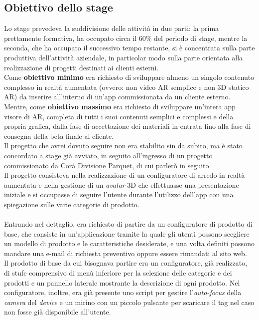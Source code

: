 \subsection{Obiettivo dello stage}
Lo stage prevedeva la suddivisione delle attivit\`a in due parti: la prima prettamente formativa, ha occupato circa il 60\% del periodo di stage, mentre la seconda, che ha occupato il successivo tempo restante, si \`e concentrata sulla parte produttiva dell’attività aziendale, in particolar modo sulla parte orientata alla realizzazione di progetti destinati ai clienti esterni.
\\
Come \textbf{obiettivo minimo} era richiesto di sviluppare almeno un singolo contenuto complesso in realtà aumentata (ovvero: non video AR semplice e non 3D statico AR) da inserire all’interno di un’app commissionata da un cliente esterno. 
\\
Mentre, come \textbf{obiettivo massimo} era richiesto di sviluppare un’intera app visore di AR, completa di tutti i suoi contenuti semplici e complessi e della propria grafica, dalla fase di accettazione dei materiali in entrata fino alla fase di consegna della beta finale al cliente.
\\
Il progetto che avrei dovuto seguire non era stabilito sin da subito, ma \`e stato concordato a stage gi\`a avviato, in seguito all'ingresso di un progetto commissionato da Cor\`a Divisione Parquet, di cui parler\`o in seguito.
\\
Il progetto consisteva nella realizzazione di un configuratore di arredo in realt\`a aumentata e nella gestione di un \textit{avatar\gloss} 3D che effettuasse una presentazione iniziale e si occupasse di seguire l'utente durante l'utilizzo dell'app con una spiegazione sulle varie categorie di prodotto.
\\\\
Entrando nel dettaglio, era richiesto di partire da un configuratore di prodotto di base, che consiste in un'applicazione tramite la quale gli utenti possono scegliere un modello di prodotto e le caratteristiche desiderate, e una volta definiti possono mandare una e-mail di richiesta preventivo oppure essere rimandati al sito web. 
\\
Il prodotto di base da cui bisognava partire era un configuratore, gi\`a realizzato, di stufe comprensivo di men\`u inferiore per la selezione delle categorie e dei prodotti e un pannello laterale mostrante la descrizione di ogni prodotto. Nel configuratore, inoltre, era gi\`a presente uno script per gestire l'\textit{auto-focus} della \textit{camera} del \textit{device} e un mirino con un piccolo pulsante per scaricare il tag nel caso non fosse gi\`a disponibile all'utente.

